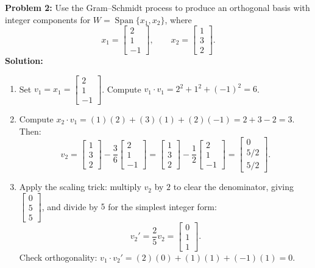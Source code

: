 \documentclass[11pt, letterpaper]{article}
\theoremstyle{definition}
\theoremstyle{remark}
\begin{document}
\vspace{0.8em}

\textbf{Problem 2:} Use the Gram--Schmidt process to produce an orthogonal basis with integer components for $W = \operatorname{Span}\{x_1, x_2\}$, where
\[
    x_1 = \begin{bmatrix} 2 \\ 1 \\ -1 \end{bmatrix}, \qquad x_2 = \begin{bmatrix} 1 \\ 3 \\ 2 \end{bmatrix}.
\]
\textbf{Solution:}
\begin{enumerate}[label=\textbf{Step \arabic*:}]
    \item Set $v_1 = x_1 = \begin{bmatrix} 2 \\ 1 \\ -1 \end{bmatrix}$. Compute $v_1 \cdot v_1 = 2^2 + 1^2 + (-1)^2 = 6$.
    \item Compute $x_2 \cdot v_1 = (1)(2) + (3)(1) + (2)(-1) = 2 + 3 - 2 = 3$. Then:
    \[
        v_2 = \begin{bmatrix} 1 \\ 3 \\ 2 \end{bmatrix} - \frac{3}{6}\begin{bmatrix} 2 \\ 1 \\ -1 \end{bmatrix}
        = \begin{bmatrix} 1 \\ 3 \\ 2 \end{bmatrix} - \frac{1}{2}\begin{bmatrix} 2 \\ 1 \\ -1 \end{bmatrix}
        = \begin{bmatrix} 0 \\ 5/2 \\ 5/2 \end{bmatrix}.
    \]
    \item Apply the scaling trick: multiply $v_2$ by $2$ to clear the denominator, giving $\begin{bmatrix} 0 \\ 5 \\ 5 \end{bmatrix}$, and divide by $5$ for the simplest integer form:
    \[
        v_2' = \frac{2}{5} v_2 = \begin{bmatrix} 0 \\ 1 \\ 1 \end{bmatrix}.
    \]
    Check orthogonality: $v_1 \cdot v_2' = (2)(0) + (1)(1) + (-1)(1) = 0$.
\end{enumerate}
\end{document}
